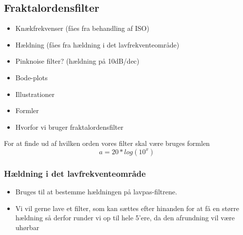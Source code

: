 \subsection{Fraktalordensfilter}
\label{Fraktalordensfilter}
%
\begin{itemize}
  \item Knækfrekvenser (fåes fra behandling af ISO)
  \item Hældning (fåes fra hældning i det lavfrekventeområde)
  \item Pinknoise filter? (hældning på 10dB/dec)
  \item Bode-plots
  \item Illustrationer
  \item Formler
  \item Hvorfor vi bruger fraktalordensfilter
\end{itemize}
\noindent
%
For at finde ud af hvilken orden vores filter skal være bruges formlen 
\begin{equation}
	a=20*log(10^x)
\end{equation}

%
\subsubsection{Hældning i det lavfrekventeområde}
\label{HaeldningIDetLavfrekventeområde}
%
\begin{itemize}
	\item Bruges til at bestemme hældningen på lavpas-filtrene.
	\item Vi vil gerne lave et filter, som kan sættes efter hinanden for at få en større hældning så derfor runder vi op til hele 5'ere, da den afrundning vil være uhørbar
\end{itemize}

